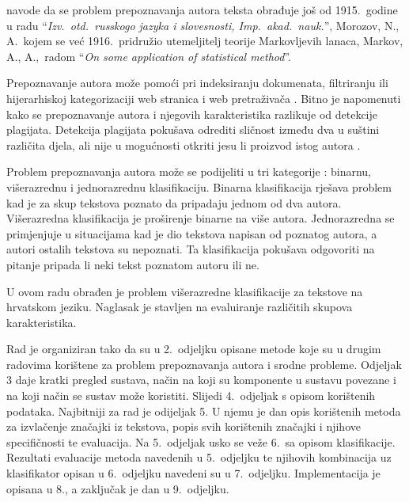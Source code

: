 \documentclass[11pt,english]{article}
\begin{document}
\begin{multicols}{2}
\citet{kukushkina2001using} navode da se problem prepoznavanja autora teksta
obrađuje još od 1915.~godine u radu ``\emph{Izv.~otd.~russkogo jazyka i
slovesnosti, Imp.~akad.~nauk.}'', Morozov, N., A.~kojem se već 1916.~pridružio
utemeljitelj teorije Markovljevih lanaca, Markov, A., A.,~radom ``\emph{On some
application of statistical method}''.

Prepoznavanje autora može pomoći pri indeksiranju dokumenata, filtriranju ili
hijerarhiskoj kategorizaciji web stranica i web pretraživača
\citep{luyckx2005shallow}. Bitno je napomenuti kako se prepoznavanje autora i
njegovih karakteristika razlikuje od detekcije plagijata. Detekcija
plagijata pokušava odrediti sličnost između dva u suštini različita
djela, ali nije u mogućnosti otkriti jesu li proizvod istog autora
\citep{de2001mining}.

Problem prepoznavanja autora može se podijeliti u tri kategorije
\citep{zhao2005effective}: binarnu, višerazrednu i jednorazrednu klasifikaciju.
Binarna klasifikacija rješava problem kad je za skup tekstova poznato da
pripadaju jednom od dva autora. Višerazredna klasifikacija je proširenje
binarne na više autora. Jednorazredna se primjenjuje u situacijama kad je
dio tekstova napisan od poznatog autora, a autori ostalih tekstova su
nepoznati. Ta klasifikacija pokušava odgovoriti na pitanje pripada li neki
tekst poznatom autoru ili ne.

U ovom radu obrađen je problem višerazredne klasifikacije za tekstove na
hrvatskom jeziku. Naglasak je stavljen na evaluiranje različitih skupova
karakteristika.

Rad je organiziran tako da su u 2.~odjeljku opisane metode koje su u drugim
radovima korištene za problem prepoznavanja autora i srodne probleme. Odjeljak 3
daje kratki pregled sustava, način na koji su komponente u sustavu povezane i na
koji način se sustav može koristiti. Slijedi 4.~odjeljak s opisom korištenih
podataka. Najbitniji za rad je odijeljak 5. U njemu je dan opis korištenih metoda
za izvlačenje značajki iz tekstova, popis svih korištenih značajki i njihove
specifičnosti te evaluacija. Na 5.~odjeljak usko se veže 6.~sa opisom
klasifikacije. Rezultati evaluacije metoda navedenih u 5.~odjeljku te njihovih
kombinacija uz klasifikator opisan u 6.~odjeljku navedeni su u 7.~odjeljku.
Implementacija je opisana u 8., a zaključak je dan u 9.~odjeljku.


\end{multicols}
\end{document}
